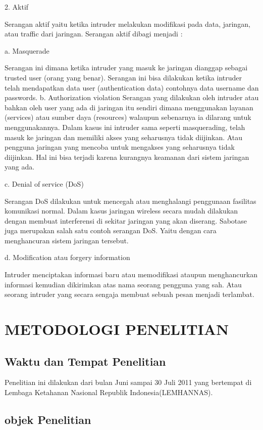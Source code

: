 \documentclass{jtetiproposalskripsi}
\begin{document}
2. Aktif

Serangan aktif yaitu ketika intruder melakukan modifikasi pada
data, jaringan, atau traffic dari jaringan. Serangan aktif dibagi menjadi :

a. Masquerade

Serangan ini dimana ketika intruder yang masuk ke jaringan
dianggap sebagai trusted user (orang yang benar). Serangan ini
bisa dilakukan ketika intruder telah mendapatkan data user
(authentication data) contohnya data username dan passwords. 
b. Authorization violation
Serangan yang dilakukan oleh intruder atau bahkan oleh user yang ada di jaringan itu sendiri dimana menggunakan layanan (services) atau sumber daya (resources) walaupun sebenarnya ia dilarang untuk menggunakannya. Dalam kasus ini intruder sama seperti masquerading, telah masuk ke jaringan dan memiliki akses yang seharusnya tidak diijinkan. Atau pengguna jaringan yang mencoba untuk mengakses yang seharusnya tidak diijinkan. Hal ini bisa terjadi karena kurangnya keamanan dari sistem jaringan yang ada.

c. Denial of service (DoS)

Serangan DoS dilakukan untuk mencegah atau menghalangi penggunaan fasilitas komunikasi normal. Dalam kasus jaringan wireless secara mudah dilakukan dengan membuat interferensi di sekitar jaringan yang akan diserang. Sabotase juga merupakan salah satu contoh serangan DoS. Yaitu dengan cara menghancuran sistem jaringan tersebut.

d. Modification atau forgery information

Intruder menciptakan informasi baru atau memodifikasi ataupun menghancurkan informasi kemudian dikirimkan atas nama seorang pengguna yang sah. Atau seorang intruder yang secara sengaja membuat sebuah pesan menjadi terlambat.
\chapter{METODOLOGI PENELITIAN}

\section{Waktu dan Tempat Penelitian}

Penelitian ini dilakukan dari bulan Juni sampai 30 Juli 2011 yang bertempat di Lembaga Ketahanan Nasional Republik Indonesia(LEMHANNAS).

\section{objek Penelitian}
\end{document}
